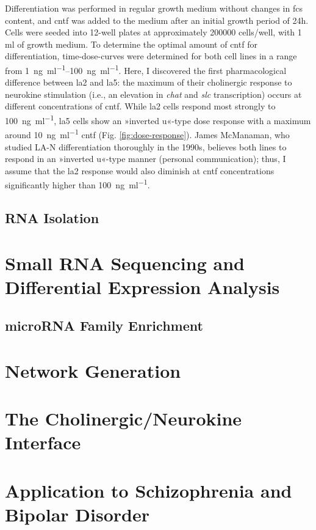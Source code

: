 Differentiation was performed in regular growth medium without changes in \ac{fcs} content, and \ac{cntf} was added to the medium after an initial growth period of 24h. Cells were seeded into 12-well plates at approximately \num{200000} cells/well, with 1 ml of growth medium. To determine the optimal amount of \ac{cntf} for differentiation, time-dose-curves were determined for both cell lines in a range from \SIrange{1}{100}{\nano\gram\per\milli\litre}. Here, I discovered the first pharmacological difference between \ac{la2} and \ac{la5}: the maximum of their cholinergic response to neurokine stimulation (i.e., an elevation in \textit{\ac{chat}} and \textit{\ac{slc}} transcription) occurs at different concentrations of \ac{cntf}. While \ac{la2} cells respond most strongly to \SI{100}{\nano\gram\per\milli\litre}, \ac{la5} cells show an »inverted u«-type dose response with a maximum around \SI{10}{\nano\gram\per\milli\litre} \ac{cntf} (Fig. \ref{fig:dose-response}). James McManaman, who studied LA-N differentiation thoroughly in the 1990s\cite{McManaman1991}, believes both lines to respond in an »inverted u«-type manner (personal communication); thus, I assume that the \ac{la2} response would also diminish at \ac{cntf} concentrations significantly higher than  \SI{100}{\nano\gram\per\milli\litre}.
\subsection{RNA Isolation}
\section{Small RNA Sequencing and Differential Expression Analysis}
\subsection{microRNA Family Enrichment}
\section{Network Generation}
\section{The Cholinergic/Neurokine Interface}
\section{Application to Schizophrenia and Bipolar Disorder}
